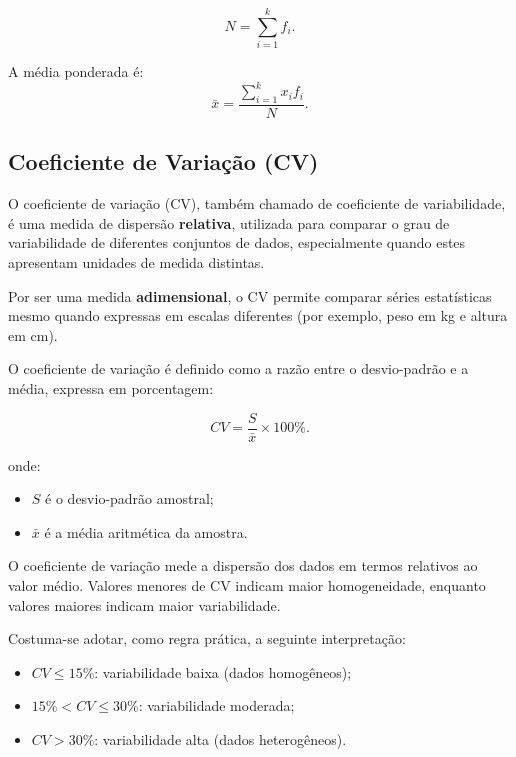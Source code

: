 \begin{equation}
N=\sum_{i=1}^{k}f_i.
\end{equation}

A média ponderada é:
\begin{equation}
\bar{x}=\frac{\sum_{i=1}^{k}x_i f_i}{N}.
\end{equation}

\newpage
\subsection{Coeficiente de Variação (CV)}

O coeficiente de variação (CV), também chamado de coeficiente de variabilidade,
é uma medida de dispersão \textbf{relativa}, utilizada para comparar o grau de
variabilidade de diferentes conjuntos de dados, especialmente quando estes
apresentam unidades de medida distintas.\vskip0.3cm

Por ser uma medida \textbf{adimensional}, o CV permite comparar séries estatísticas
mesmo quando expressas em escalas diferentes (por exemplo, peso em kg e altura em cm). \vskip0.3cm

O coeficiente de variação é definido como a razão entre o desvio-padrão e a média,
expressa em porcentagem:

\begin{equation}\label{eq:cv}
CV=\frac{S}{\bar{x}}\times 100\%.
\end{equation}

onde:
\begin{itemize}
    \item $S$ é o desvio-padrão amostral;
    \item $\bar{x}$ é a média aritmética da amostra.
\end{itemize}

O coeficiente de variação mede a dispersão dos dados em termos relativos ao valor
médio. Valores menores de CV indicam maior homogeneidade, enquanto valores maiores
indicam maior variabilidade.

Costuma-se adotar, como regra prática, a seguinte interpretação:

\begin{itemize}
    \item $CV \leq 15\%$: variabilidade baixa (dados homogêneos);
    \item $15\% < CV \leq 30\%$: variabilidade moderada;
    \item $CV > 30\%$: variabilidade alta (dados heterogêneos).
\end{itemize}


